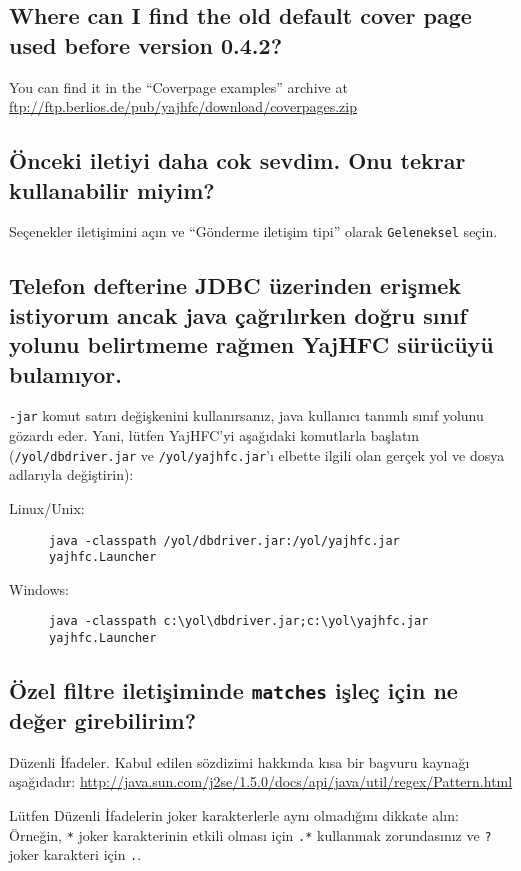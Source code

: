 \documentclass[a4paper,10pt]{scrartcl}
\begin{document}
\subsection{Where can I find the old default cover page used before version 0.4.2?}

You can find it in the ``Coverpage examples'' archive at \url{ftp://ftp.berlios.de/pub/yajhfc/download/coverpages.zip}


\subsection{Önceki iletiyi daha cok sevdim. Onu tekrar kullanabilir miyim?}

Seçenekler iletişimini açın ve ``Gönderme iletişim tipi'' olarak \texttt{Geleneksel} seçin.

\subsection{Telefon defterine JDBC üzerinden erişmek istiyorum ancak java çağrılırken doğru sınıf yolunu belirtmeme rağmen YajHFC sürücüyü bulamıyor.}

\texttt{-jar} komut satırı değişkenini kullanırsanız, java kullanıcı tanımlı sınıf yolunu gözardı eder.
Yani, lütfen YajHFC'yi aşağıdaki komutlarla başlatın (\texttt{/yol/dbdriver.jar} ve \texttt{/yol/yajhfc.jar}'ı elbette ilgili olan gerçek yol ve dosya adlarıyla değiştirin):

\begin{description}
\item [Linux/Unix:] \verb#java -classpath /yol/dbdriver.jar:/yol/yajhfc.jar yajhfc.Launcher#
\item [Windows:] \verb#java -classpath c:\yol\dbdriver.jar;c:\yol\yajhfc.jar yajhfc.Launcher#
\end{description}

\subsection{Özel filtre iletişiminde \texttt{matches} işleç için ne değer girebilirim?}

Düzenli İfadeler. Kabul edilen sözdizimi hakkında kısa bir başvuru kaynağı aşağıdadır:
\url{http://java.sun.com/j2se/1.5.0/docs/api/java/util/regex/Pattern.html}

Lütfen Düzenli İfadelerin joker karakterlerle aynı olmadığını dikkate alın:
Örneğin, \verb.*. joker karakterinin etkili olması için \verb#.*# kullanmak zorundasınız 
ve \verb#?# joker karakteri için \verb#.#.
\end{document}
